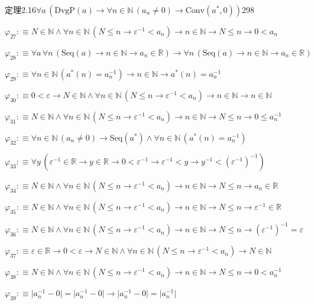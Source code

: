 \begin{fullproof}{定理2.16}{$\forall a\,(\mathrm{DvgP}(a) \to \forall n \in \mathbb{N}\,(a_{n} \neq 0) \to \mathrm{Conv}(a^{\ast},0))$}{298}
\begin{abbrevlist}
\item $\varphi_{27} :\equiv N \in \mathbb{N} \land \forall n \in \mathbb{N}\,(N \leq n \to \varepsilon^{-1} < a_{n}) \to n \in \mathbb{N} \to N \leq n \to 0 < a_{n}$
\item $\varphi_{28} :\equiv \forall a\,\forall n\,(\mathrm{Seq}(a) \to n \in \mathbb{N} \to a_{n} \in \mathbb{R}) \to \forall n\,(\mathrm{Seq}(a) \to n \in \mathbb{N} \to a_{n} \in \mathbb{R})$
\item $\varphi_{29} :\equiv \forall n \in \mathbb{N}\,(a^{\ast}(n) = a_{n}^{-1}) \to n \in \mathbb{N} \to a^{\ast}(n) = a_{n}^{-1}$
\item $\varphi_{30} :\equiv 0 < \varepsilon \to N \in \mathbb{N} \land \forall n \in \mathbb{N}\,(N \leq n \to \varepsilon^{-1} < a_{n}) \to n \in \mathbb{N} \to n \in \mathbb{N}$
\item $\varphi_{31} :\equiv N \in \mathbb{N} \land \forall n \in \mathbb{N}\,(N \leq n \to \varepsilon^{-1} < a_{n}) \to n \in \mathbb{N} \to N \leq n \to 0 \leq a_{n}^{-1}$
\item $\varphi_{32} :\equiv \forall n \in \mathbb{N}\,(a_{n} \neq 0) \to \mathrm{Seq}(a^{\ast}) \land \forall n \in \mathbb{N}\,(a^{\ast}(n) = a_{n}^{-1})$
\item $\varphi_{33} :\equiv \forall y\,(\varepsilon^{-1} \in \mathbb{R} \to y \in \mathbb{R} \to 0 < \varepsilon^{-1} \to \varepsilon^{-1} < y \to y^{-1} < (\varepsilon^{-1})^{-1})$
\item $\varphi_{34} :\equiv N \in \mathbb{N} \land \forall n \in \mathbb{N}\,(N \leq n \to \varepsilon^{-1} < a_{n}) \to n \in \mathbb{N} \to N \leq n \to a_{n} \in \mathbb{R}$
\item $\varphi_{35} :\equiv N \in \mathbb{N} \land \forall n \in \mathbb{N}\,(N \leq n \to \varepsilon^{-1} < a_{n}) \to n \in \mathbb{N} \to N \leq n \to \varepsilon^{-1} \in \mathbb{R}$
\item $\varphi_{36} :\equiv N \in \mathbb{N} \land \forall n \in \mathbb{N}\,(N \leq n \to \varepsilon^{-1} < a_{n}) \to n \in \mathbb{N} \to N \leq n \to (\varepsilon^{-1})^{-1} = \varepsilon$
\item $\varphi_{37} :\equiv \varepsilon \in \mathbb{R} \to 0 < \varepsilon \to N \in \mathbb{N} \land \forall n \in \mathbb{N}\,(N \leq n \to \varepsilon^{-1} < a_{n}) \to N \in \mathbb{N}$
\item $\varphi_{38} :\equiv N \in \mathbb{N} \land \forall n \in \mathbb{N}\,(N \leq n \to \varepsilon^{-1} < a_{n}) \to n \in \mathbb{N} \to N \leq n \to 0 < a_{n}^{-1}$
\item $\varphi_{39} :\equiv \lvert a_{n}^{-1} - 0 \rvert = \lvert a_{n}^{-1} - 0 \rvert \to \lvert a_{n}^{-1} - 0 \rvert = \lvert a_{n}^{-1} \rvert$

\end{abbrevlist}
\end{fullproof}
